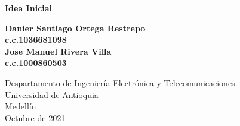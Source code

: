 \documentclass{article}
\begin{document}
\begin{titlepage}
    \begin{center}
        \vspace*{1cm}

        \Huge
        \textbf{Idea Inicial}
            
        \vspace{0.5cm}
        \LARGE
            
        \vspace{1.5cm}
            
        \textbf{Danier Santiago Ortega Restrepo}\\
        \textbf{c.c.1036681098}\\
        
        \textbf{Jose Manuel Rivera Villa}\\
        \textbf{c.c.1000860503}
            
        \vfill
            
        \vspace{0.8cm}
            
        \Large
        Despartamento de Ingeniería Electrónica y Telecomunicaciones\\
        Universidad de Antioquia\\
        Medellín\\
       Octubre de 2021

    \end{center}
\end{titlepage}

\tableofcontents
\newpage
\end{document}
